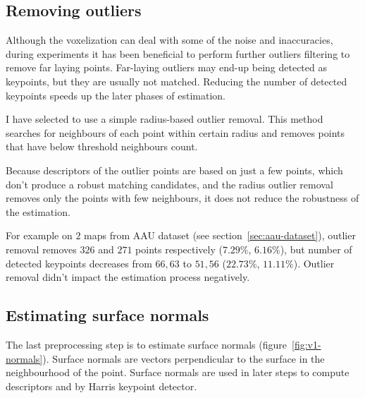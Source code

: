 \subsection{Removing outliers}
\label{sec:outlier-removal}

Although the voxelization can deal with some of the noise and inaccuracies, during experiments it has been beneficial to perform further outliers filtering to remove far laying points. Far-laying outliers may end-up being detected as keypoints, but they are usually not matched. Reducing the number of detected keypoints speeds up the later phases of estimation.

I have selected to use a simple radius-based outlier removal. This method searches for neighbours of each point within certain radius and removes points that have below threshold neighbours count.

Because descriptors of the outlier points are based on just a few points, which don't produce a robust matching candidates, and the radius outlier removal removes only the points with few neighbours, it does not reduce the robustness of the estimation.

For example on $2$ maps from \gls{AAU} dataset (see section~\ref{sec:aau-dataset}), outlier removal removes $326$ and $271$ points respectively ($7.29\%$, $6.16\%$), but number of detected keypoints decreases from $66, 63$ to $51, 56$ ($22.73\%$, $11.11\%$). Outlier removal didn't impact the estimation process negatively.

\subsection{Estimating surface normals}
\label{sec:normal-estimation}

The last preprocessing step is to estimate surface normals (figure~\ref{fig:v1-normals}). Surface normals are vectors perpendicular to the surface in the neighbourhood of the point. Surface normals are used in later steps to compute descriptors and by Harris keypoint detector.

